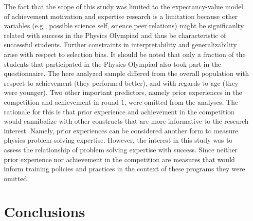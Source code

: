 \documentclass[]{interact}
\begin{document}
The fact that the scope of this study was limited to the expectancy-value model of achievement motivation and expertise research is a limitation because other variables (e.g., possible science self, science peer relations) might be significanlty related with success in the Physics Olympiad and thus be characteristic of successful students. Further constraints in interpretability and generalizability arise with respect to selection bias. It should be noted that only a fraction of the students that participated in the Physics Olympiad also took part in the questionnaire. The here analyzed sample differed from the overall population with respect to achievement (they performed better), and with regards to age (they were younger). Two other important predictors, namely prior experiences in the competition and achievement in round 1, were omitted from the analyses. The rationale for this is that prior experience and achievement in the competition would cannibalize with other constructs that are more informative to the research interest. Namely, prior experiences can be considered another form to measure physics problem solving expertise. However, the interest in this study was to assess the relationship of problem solving expertise with success. Since neither prior experience nor achievement in the competition are measures that would inform training policies and practices in the context of these programs they were omitted.

\section{Conclusions}
\end{document}
